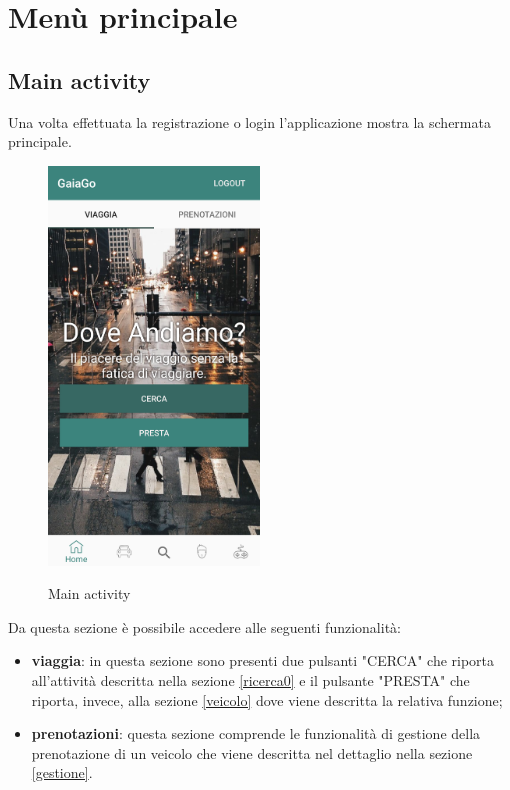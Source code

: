 \section{Menù principale}
\subsection{Main activity}
Una volta effettuata la registrazione o login l'applicazione mostra la schermata principale.
\begin{figure}[H] 
	\centering 
	\includegraphics[width=0.5\textwidth]{res/images/home.png}\\
	\caption{Main activity}
	\label{Login}
\end{figure}
\pagebreak 
Da questa sezione è possibile accedere alle seguenti funzionalità:
\begin{itemize}
	\item \textbf{viaggia}: in questa sezione sono presenti due pulsanti "CERCA" che riporta all'attività descritta nella sezione \ref{ricerca0} e il pulsante "PRESTA" che riporta, invece, alla sezione \ref{veicolo} dove viene descritta la relativa funzione;
	\item \textbf{prenotazioni}: questa sezione comprende le funzionalità di gestione della prenotazione di un veicolo che viene descritta nel dettaglio nella sezione \ref{gestione}.
\end{itemize}
